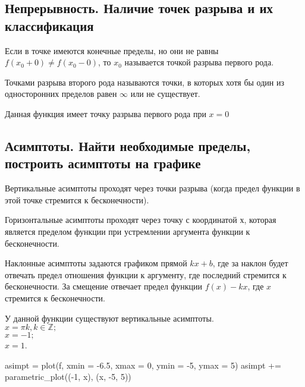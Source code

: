 \subsection{Непрерывность. Наличие точек разрыва и их классификация}

Если в точке имеются конечные пределы, но они не равны $f(x_0+0) \neq f(x_0-0)$, то $x_0$ называется точкой разрыва первого рода.

Точками разрыва второго рода называются точки, в которых хотя бы один из односторонних пределов равен $\infty$ или не существует.

Данная функция имеет точку разрыва первого рода при $x=0$

\subsection{Асимптоты. Найти необходимые пределы, построить асимптоты на графике}

Вертикальные асимптоты проходят через точки разрыва (когда предел функции в этой точке стремится к бесконечности). 

Горизонтальные асимптоты проходят через точку с координатой $х$, которая является пределом функции при устремлении аргумента функции к бесконечности.

Наклонные асимптоты задаются графиком прямой $kx+b$, где за наклон будет отвечать предел отношения функции к аргументу, где последний стремится к бесконечности. За смещение отвечает предел функции $f(x)-kx$, где $x$ стремится к бесконечности.

У данной функции существуют вертикальные асимптоты.\\$x=\pi k, k \in \mathbb{Z};$\\$x = -1;$\\$x = 1$.
\begin{sagesilent}
	asimpt = plot(f, xmin = -6.5, xmax = 0, ymin = -5, ymax = 5)
	asimpt += parametric_plot((-1, x), (x, -5, 5))
\end{sagesilent}


